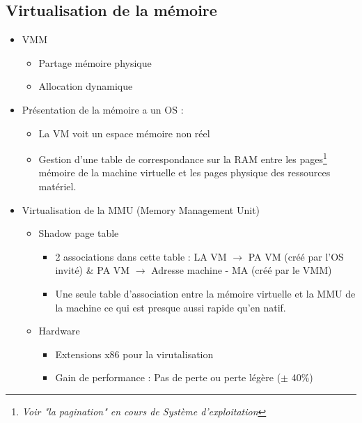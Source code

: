 \documentclass[a4paper]{article}
\begin{document}
    \subsection{Virtualisation de la mémoire}

    \begin{itemize}
      \item VMM
      \begin{itemize}
        \item Partage mémoire physique
        \item Allocation dynamique
      \end{itemize}
      \item Présentation de la mémoire a un OS :
      \begin{itemize}
        \item La VM voit un espace mémoire non réel
        \item Gestion d'une table de correspondance sur la RAM entre les pages\footnote{\emph{Voir "la pagination" en cours de Système d'exploitation}} mémoire de la machine virtuelle
        et les pages physique des ressources matériel. 
      \end{itemize}
      \item Virtualisation de la MMU (Memory Management Unit)
      \begin{itemize}
        \item Shadow page table
        \begin{itemize}
          \item 2 associations dans cette table : LA VM $\rightarrow$ PA VM (créé par l'OS invité) \& PA VM $\rightarrow$ Adresse machine - MA (créé par le VMM)
          \item Une seule table d'association entre la mémoire virtuelle et la MMU de la machine ce qui est presque aussi rapide qu'en natif.
        \end{itemize}
        \item Hardware
        \begin{itemize}
          \item Extensions x86 pour la virutalisation
          \item Gain de performance : Pas de perte ou perte légère ($\pm$ 40\%)
        \end{itemize}
      \end{itemize}
    \end{itemize}
\end{document}
